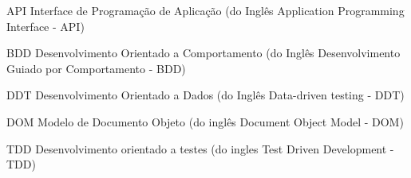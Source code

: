 %
%

\begin{siglas}
	\setlength{\baselineskip}{0.7\baselineskip}

    \item[API] Interface de Programação de Aplicação (do Inglês Application Programming Interface - API)
    \item[BDD] Desenvolvimento Orientado a Comportamento (do Inglês Desenvolvimento Guiado por Comportamento - BDD)
    \item[DDT] Desenvolvimento Orientado a Dados (do Inglês Data-driven testing - DDT)
    \item[DOM] Modelo de Documento Objeto (do inglês Document Object Model - DOM)
    \item[TDD] Desenvolvimento orientado a testes (do ingles Test Driven Development - TDD)
\end{siglas}
